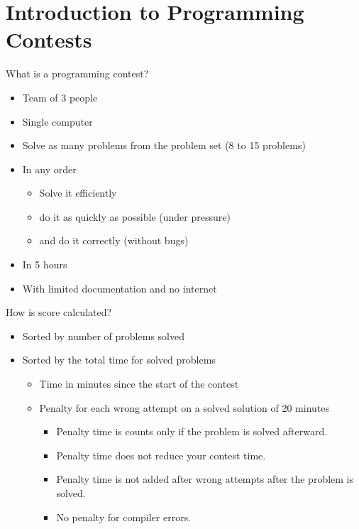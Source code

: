 \documentclass[11pt,pdf, aspectratio=169]{beamer}
\begin{document}
  \section{Introduction to Programming Contests}
  \begin{frame}{What is a programming contest?}
    \begin{itemize}
      \item<1-> Team of 3 people
      \item<1-> Single computer
      \item<1-> Solve as many problems from the problem set (8 to 15 problems)
      \item<1-> In any order
      \begin{itemize}
        \item<2-> Solve it efficiently
        \item<2-> do it as quickly as possible (under pressure)
        \item<2-> and do it correctly (without bugs)
      \end{itemize}
      \item<1-> In 5 hours
      \item <3-> With limited documentation and no internet
    \end{itemize}
  \end{frame}
  \begin{frame}{How is score calculated?}
    \begin{itemize}
      \item<1-> Sorted by number of problems solved
      \item<2-> Sorted by the total time for solved problems
      \begin{itemize}
        \item<3->  Time in minutes since the start of the contest
        \item<3-> Penalty for each wrong attempt on a solved solution of 20 minutes
        \begin{itemize}
          \item<4-> Penalty time is counts only if the problem is solved afterward.
          \item<4-> Penalty time does not reduce your contest time.
          \item<4-> Penalty time is not added after wrong attempts after the problem is solved.
          \item<4-> No penalty for compiler errors.
        \end{itemize}
      \end{itemize}
    \end{itemize}
  \end{frame}
\end{document}

